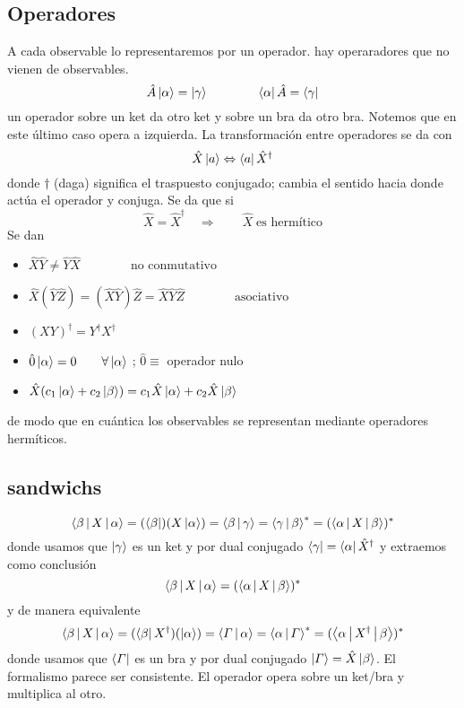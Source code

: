 \documentclass[10pt,oneside]{CBFT_book}
\begin{document}
\subsection{Operadores}

A cada observable lo representaremos por un operador. hay operaradores que no vienen de observables.
\[
	\hat{A}\Ket{\alpha} = \Ket{\gamma} \qquad \qquad  \Bra{\alpha} \hat{A} = \Bra{\gamma}
\]
un operador sobre un ket da otro ket y sobre un bra da otro bra. Notemos que en este último caso opera 
a izquierda. La transformación entre operadores se da con 
\[
	\hat{X}\Ket{a} \Leftrightarrow \Bra{a}\hat{X}^\dagger
\]
donde $\dagger$ (daga) significa el traspuesto conjugado; cambia el sentido hacia donde actúa el operador 
y conjuga. Se da que si 
\[
	\hat{X} = \hat{X}^\dagger \quad \Rightarrow \qquad \hat{X} \;\text{es hermítico}
\]
Se dan 
\begin{itemize}
 \item $\hat{X}\hat{Y} \neq \hat{Y}\hat{X} \qquad \qquad \text{no conmutativo}$
 \item $\hat{X}(\hat{Y}\hat{Z}) = (\hat{X}\hat{Y})\hat{Z} = \hat{X}\hat{Y}\hat{Z} \qquad \qquad \text{asociativo}$
 \item $(XY)^\dagger = Y^\dagger X^\dagger$
 \item $\hat{0}\Ket{\alpha} = 0 \qquad \forall \Ket{\alpha}$ ; $\hat{0} \equiv$ operador nulo
 \item $\hat{X}( c_1 \Ket{\alpha} + c_2 \Ket{\beta} ) = c_1 \hat{X}\Ket{\alpha} + c_2 \hat{X}\Ket{\beta} $
\end{itemize}

de modo que en cuántica los observables se representan mediante operadores hermíticos.

\subsection{sandwichs}

\[
	\Braket{\beta|X|\alpha} = (\Bra{\beta})(X\Ket{\alpha}) = \Braket{\beta|\gamma} =
	\Braket{\gamma|\beta}^* = (\Braket{\alpha|X|\beta})^*
\]
donde usamos que $\Ket{\gamma}$ es un ket y por dual conjugado $\Bra{\gamma} = \Bra{\alpha}\hat{X}^\dagger$ y
extraemos como conclusión 
\[
	\Braket{\beta|X|\alpha} = (\Braket{\alpha|X|\beta})^*
\]
y de manera equivalente
\[
	\Braket{\beta|X|\alpha} = (\Bra{\beta}X^\dagger)(\Ket{\alpha}) = \Braket{\Gamma|\alpha} =
	\Braket{\alpha|\Gamma}^* = (\Braket{\alpha|X^\dagger|\beta})^*
\]
donde usamos que $\Bra{\Gamma}$ es un bra y por dual conjugado $\Ket{\Gamma} = \hat{X}\Ket{\beta}$.
El formalismo parece ser consistente. El operador opera sobre un ket/bra y multiplica al otro.
\end{document}
